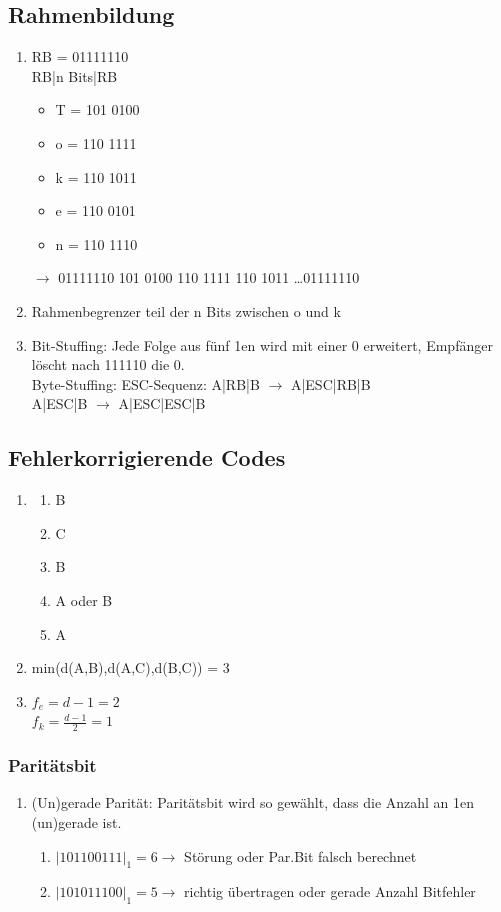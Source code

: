 \subsection{Rahmenbildung}
\begin{enumerate}
	\item RB = 01111110\\
	RB|n Bits|RB
	\begin{itemize}
		\item T = 101 0100
		\item o = 110 1111
		\item k = 110 1011
		\item e = 110 0101
		\item n = 110 1110
	\end{itemize}
	\(\to\) 01111110 101 0100 110 1111 110 1011 \ldots 01111110
	\item Rahmenbegrenzer teil der n Bits zwischen o und k
	\item Bit-Stuffing: Jede Folge aus fünf 1en wird mit einer 0 erweitert, Empfänger löscht nach 111110 die 0.\\
	Byte-Stuffing: ESC-Sequenz: A|RB|B \(\to\) A|ESC|RB|B\\
	A|ESC|B \(\to\) A|ESC|ESC|B
\end{enumerate}
\subsection{Fehlerkorrigierende Codes}
\begin{enumerate}
	\item 
	\begin{enumerate}
		\item B
		\item C
		\item B
		\item A oder B
		\item A
	\end{enumerate}
	\item min(d(A,B),d(A,C),d(B,C)) = $  $3
	\item $ f_e = d-1 = 2$\\ $f_k = \frac{d-1}{2} = 1$
\end{enumerate}
\subsubsection{Paritätsbit}
\begin{enumerate}
	\item (Un)gerade Parität: Paritätsbit wird so gewählt, dass die Anzahl an 1en (un)gerade ist.
	\begin{enumerate}
		\item $|101100111|_1 = 6 \to $ Störung oder Par.Bit falsch berechnet
		\item $|101011100|_1 = 5 \to $ richtig übertragen oder gerade Anzahl Bitfehler
	\end{enumerate}
\end{enumerate}
